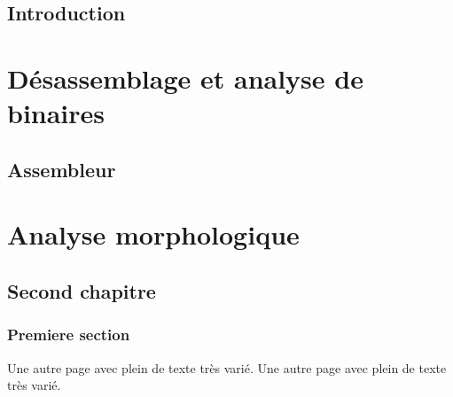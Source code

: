 \documentclass[11pt]{TUL/thesul}
\begin{document}
\tableofcontents




\NoChapterHead

\DontWriteThisInToc   
\listoffigures


\mainmatter

\DontFrameThisInToc
\NumberThisInToc
\chapter{Introduction}

\WriteThisInToc
\FrameThisInToc
\NumberThisInToc
\part{Désassemblage et analyse de binaires}

\DontFrameThisInToc
\chapter{Assembleur}


\WriteThisInToc
\FrameThisInToc
\NumberThisInToc
\part{Analyse morphologique}
\DontFrameThisInToc
\chapter*{Second chapitre}
\section{Premiere section}

Une autre page avec plein de texte très varié.
Une autre page avec plein de texte très varié.

\PutLineInToc

\PrintIndex
\end{document}
